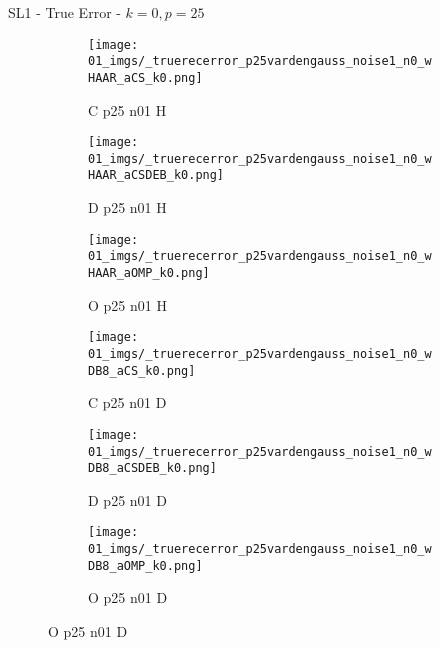 \begin{frame}{SL1 - True Error - $k=0,p=25$}{}
\begin{figure}
\begin{subfigure}{0.13\textwidth}
\texttt{[image: 01\_imgs/\_truerecerror\_p25vardengauss\_noise1\_n0\_wHAAR\_aCS\_k0.png]}
\caption*{\tiny C p25 n01 H}
\end{subfigure}
\begin{subfigure}{0.13\textwidth}
\texttt{[image: 01\_imgs/\_truerecerror\_p25vardengauss\_noise1\_n0\_wHAAR\_aCSDEB\_k0.png]}
\caption*{\tiny D p25 n01 H}
\end{subfigure}
\begin{subfigure}{0.13\textwidth}
\texttt{[image: 01\_imgs/\_truerecerror\_p25vardengauss\_noise1\_n0\_wHAAR\_aOMP\_k0.png]}
\caption*{\tiny O p25 n01 H}
\end{subfigure}
\begin{subfigure}{0.13\textwidth}
\texttt{[image: 01\_imgs/\_truerecerror\_p25vardengauss\_noise1\_n0\_wDB8\_aCS\_k0.png]}
\caption*{\tiny C p25 n01 D}
\end{subfigure}
\begin{subfigure}{0.13\textwidth}
\texttt{[image: 01\_imgs/\_truerecerror\_p25vardengauss\_noise1\_n0\_wDB8\_aCSDEB\_k0.png]}
\caption*{\tiny D p25 n01 D}
\end{subfigure}
\begin{subfigure}{0.13\textwidth}
\texttt{[image: 01\_imgs/\_truerecerror\_p25vardengauss\_noise1\_n0\_wDB8\_aOMP\_k0.png]}
\caption*{\tiny O p25 n01 D}
\end{subfigure}

\vspace{5pt}


\end{figure}
\end{frame}
